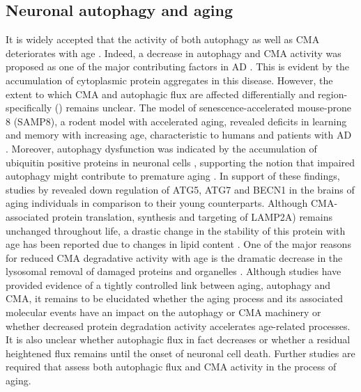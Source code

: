 \subsection{Neuronal autophagy and aging}
It is widely accepted that the activity of both autophagy as well as CMA deteriorates with age \citep{Cuervo2005}. Indeed, a decrease in autophagy and CMA activity was proposed as one of the major contributing factors in AD \citep{Cuervo2005}. This is evident by the accumulation of cytoplasmic protein aggregates in this disease. However, the extent to which CMA and autophagic flux are affected differentially and region-specifically () remains unclear. The model of senescence-accelerated mouse-prone 8 (SAMP8), a rodent model with accelerated aging, revealed deficits in learning and memory with increasing age, characteristic to humans and patients with AD \citep{Ma2011}. Moreover, autophagy dysfunction was indicated by the accumulation of ubiquitin positive proteins in neuronal cells \citep{Ma2011}, supporting the notion that impaired autophagy might contribute to premature aging \citep{Vellai2003}. In support of these findings, studies by \citet{Lipinski2010} revealed down regulation of ATG5, ATG7 and BECN1 in the brains of aging individuals in comparison to their young counterparts. Although CMA-associated protein translation, synthesis and targeting of LAMP2A) remains unchanged throughout life, a drastic change in the stability of this protein with age has been reported due to changes in lipid content \citep{Cuervo2014}. One of the major reasons for reduced CMA degradative activity with age is the dramatic decrease in the lysosomal removal of damaged proteins and organelles \citep{Massey2006}. Although studies have provided evidence of a tightly controlled link between aging, autophagy and CMA, it remains to be elucidated whether the aging process and its associated molecular events have an impact on the autophagy or CMA machinery or whether decreased protein degradation activity accelerates age-related processes. It is also unclear whether autophagic flux in fact decreases or whether a residual heightened flux remains until the onset of neuronal cell death. Further studies are required that assess both autophagic flux and CMA activity in the process of aging. 

